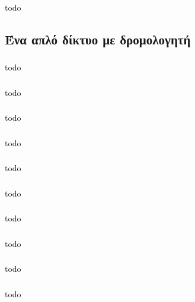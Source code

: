 \documentclass[a4paper, 12pt]{article}
\begin{document}
		\subsubsection{}
			todo

	\subsection{Ένα απλό δίκτυο με δρομολογητή}

		\subsubsection{}
			todo

		\subsubsection{}
			todo

		\subsubsection{}
			todo

		\subsubsection{}
			todo

		\subsubsection{}
			todo

		\subsubsection{}
			todo

		\subsubsection{}
			todo

		\subsubsection{}
			todo

		\subsubsection{}
			todo

		\subsubsection{}
			todo
\end{document}
